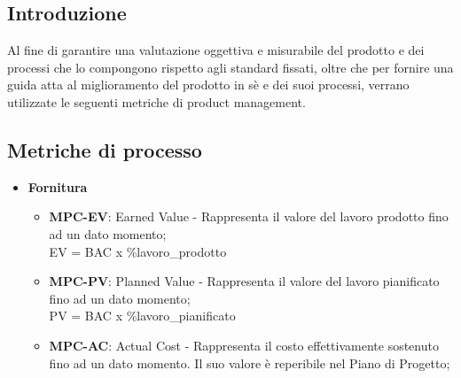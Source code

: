 \subsection{Introduzione}
Al fine di garantire una valutazione oggettiva e misurabile del prodotto e dei processi che lo compongono rispetto agli standard fissati, oltre che per fornire una guida atta al miglioramento del prodotto in sè e dei suoi processi, verrano utilizzate le seguenti metriche di product management. 

\subsection{Metriche di processo}
\begin{itemize}
    \item \textbf{Fornitura}
        \begin{itemize}
            \item \textbf{MPC-EV}: Earned Value - Rappresenta il valore del lavoro prodotto fino ad un dato momento;\\
                EV = BAC x \%lavoro_prodotto\\  
            \item \textbf{MPC-PV}: Planned Value - Rappresenta il valore del lavoro pianificato fino ad un dato momento;\\
                PV = BAC x \%lavoro_pianificato\\
            \item \textbf{MPC-AC}: Actual Cost - Rappresenta il costo effettivamente sostenuto fino ad un dato momento. Il suo valore è reperibile nel Piano di Progetto;\\


\end{itemize}
\end{itemize}
